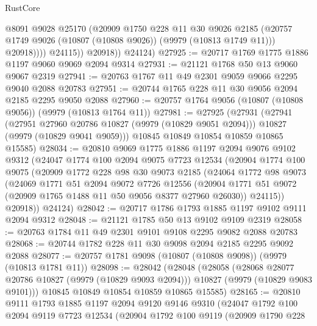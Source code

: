 \begin{lexlean}{RustCore}
\begin{coremodule}
                    @8091
                    @9028
                    @25170
                    (@20909
                      @1750
                      @228
                      @11
                      @30
                      @9026
                      @2185
                      (@20757 @1749 @9026 (@10807 (@10808 @9026)) (@9979 (@10813 @1749 @11)))
                      @20918))))
              @24115))
          @20918))
      @24124)
@27925 := @20717 @1769 @1775 @1886 @1197 @9060 @9069 @2094 @9314
@27931 := @21121 @1768 @50 @13 @9060 @9067 @2319
@27941 := @20763 @1767 @11 @49 @2301 @9059 @9066 @2295 @9040 @2088 @20783
@27951 := @20744 @1765 @228 @11 @30 @9056 @2094 @2185 @2295 @9050 @2088
@27960 := @20757 @1764 @9056 (@10807 (@10808 @9056)) (@9979 (@10813 @1764 @11))
@27981 := @27925
    (@27931
      (@27941
        (@27951 @27960 @20786 @10827 (@9979 (@10829 @9051 @2094)))
        @10827
        (@9979 (@10829 @9041 @9059)))
      @10845
      @10849
      @10854
      @10859
      @10865
      @15585)
@28034 := @20810
    @9069
    @1775
    @1886
    @1197
    @2094
    @9076
    @9102
    @9312
    (@24047
      @1774
      @100
      @2094
      @9075
      @7723
      @12534
      (@20904
        @1774
        @100
        @9075
        (@20909
          @1772
          @228
          @98
          @30
          @9073
          @2185
          (@24064
            @1772
            @98
            @9073
            (@24069
              @1771
              @51
              @2094
              @9072
              @7726
              @12556
              (@20904 @1771 @51 @9072 (@20909 @1765 @1488 @11 @50 @9056 @8377 @27960 @26030))
              @24115))
          @20918))
      @24124)
@28042 := @20717 @1786 @1793 @1885 @1197 @9102 @9111 @2094 @9312
@28048 := @21121 @1785 @50 @13 @9102 @9109 @2319
@28058 := @20763 @1784 @11 @49 @2301 @9101 @9108 @2295 @9082 @2088 @20783
@28068 := @20744 @1782 @228 @11 @30 @9098 @2094 @2185 @2295 @9092 @2088
@28077 := @20757 @1781 @9098 (@10807 (@10808 @9098)) (@9979 (@10813 @1781 @11))
@28098 := @28042
    (@28048
      (@28058
        (@28068 @28077 @20786 @10827 (@9979 (@10829 @9093 @2094)))
        @10827
        (@9979 (@10829 @9083 @9101)))
      @10845
      @10849
      @10854
      @10859
      @10865
      @15585)
@28165 := @20810
    @9111
    @1793
    @1885
    @1197
    @2094
    @9120
    @9146
    @9310
    (@24047
      @1792
      @100
      @2094
      @9119
      @7723
      @12534
      (@20904
        @1792
        @100
        @9119
        (@20909
          @1790
          @228

\end{coremodule}
\end{lexlean}
